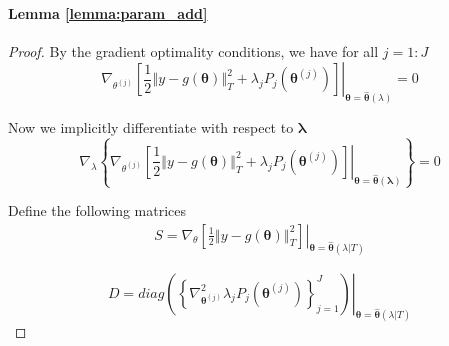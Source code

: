 \documentclass[12pt]{article}
\begin{document}
\paragraph{Lemma \ref{lemma:param_add}}
\begin{proof}
By the gradient optimality conditions, we have for all $j=1:J$ 
\begin{equation}
\label{eq:grad_opt}
\left.\nabla_{\theta^{(j)}} \left [
\frac{1}{2}\left\Vert y-g(\boldsymbol{\theta})\right\Vert _{T}^{2}+\lambda_{j}P_{j}(\boldsymbol{\theta}^{(j)})
\right ]
\right|_{\boldsymbol{\theta}=\hat{\boldsymbol{\theta}}(\lambda)}=0
\end{equation}

Now we implicitly differentiate with respect to $\boldsymbol{\lambda}$ 
\begin{equation}
\label{eq:implicit_diff}
\nabla_{\lambda}\left\{ \left.\nabla_{\theta^{(j)}}
\left [
\frac{1}{2}\left\Vert y-g(\boldsymbol{\theta})\right\Vert _{T}^{2}+\lambda_{j}P_{j}(\boldsymbol{\theta}^{(j)})
\right ]
\right|_{\boldsymbol{\theta}=\hat{\boldsymbol{\theta}}(\boldsymbol{\lambda})}\right\} =0
\end{equation}

Define the following matrices 
\begin{eqnarray*}
	S = \left.\nabla_{\theta}\left [
	\frac{1}{2}\left\Vert y-g(\boldsymbol{\theta})\right\Vert _{T}^{2}
	\right ]
	\right|_{\boldsymbol{\theta}=\hat{\boldsymbol{\theta}}(\lambda | T)}
	\end{eqnarray*}
	
	\[
	D=\left.diag\left(\left\{ \nabla_{\boldsymbol{\theta}^{(j)}}^{2}\lambda_{j}P_{j}(\boldsymbol{\theta}^{(j)})\right\} _{j=1}^{J}\right)\right|_{\boldsymbol{\theta}=\hat{\boldsymbol{\theta}}(\lambda|T)}
	\]
	

\end{proof}
\end{document}
